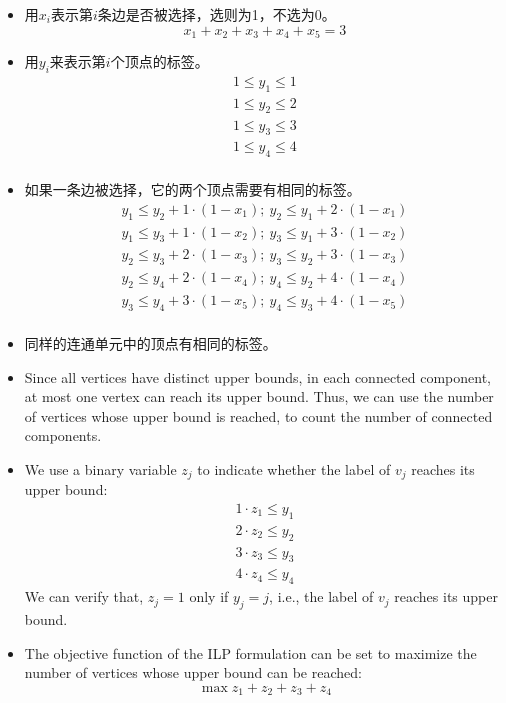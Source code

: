 \begin{itemize}
	\item 用$x_{i}$表示第$i$条边是否被选择，选则为1，不选为0。
		\begin{displaymath}
			x_1 + x_2 + x_3 + x_4 + x_5 = 3
		\end{displaymath}
    \item 用$y_i$来表示第$i$个顶点的标签。
		\begin{eqnarray*}
			1\le  y_1  \le 1\\
			1\le  y_2  \le 2\\
			1\le  y_3  \le 3\\
			1\le  y_4  \le 4\\
		\end{eqnarray*}
    \item 如果一条边被选择，它的两个顶点需要有相同的标签。
		\begin{align*}
			y_1 \le y_2 + 1 \cdot (1 - x_1);\  y_2 \le y_1 + 2 \cdot (1 - x_1) \tag{for $e_1$}\\
			y_1 \le y_3 + 1 \cdot (1 - x_2);\  y_3 \le y_1 + 3 \cdot (1 - x_2) \tag{for $e_2$}\\
			y_2 \le y_3 + 2 \cdot (1 - x_3);\  y_3 \le y_2 + 3 \cdot (1 - x_3) \tag{for $e_3$}\\
			y_2 \le y_4 + 2 \cdot (1 - x_4);\  y_4 \le y_2 + 4 \cdot (1 - x_4) \tag{for $e_4$}\\
			y_3 \le y_4 + 3 \cdot (1 - x_5);\  y_4 \le y_3 + 4 \cdot (1 - x_5) \tag{for $e_5$}\\
		\end{align*}
    \item 同样的连通单元中的顶点有相同的标签。

	\item Since all vertices have distinct upper bounds, in each connected
	component, at most one vertex can reach its upper bound. Thus, we
	can use the number of vertices whose upper bound is reached, to count the number of connected components.
    \item<2-> We use a binary variable $z_j$ to indicate whether the label of $v_j$ reaches its upper bound:
		\begin{eqnarray*}
			1 \cdot z_1 \le y_1 \\
			2 \cdot z_2 \le y_2 \\
			3 \cdot z_3 \le y_3 \\
			4 \cdot z_4 \le y_4
		\end{eqnarray*}
	We can verify that, $z_j = 1$ only if $y_j = j$, i.e., the label of $v_j$ reaches its upper bound.
	\item The objective function of the ILP formulation can be set to maximize the number of vertices
		whose upper bound can be reached:
		\begin{displaymath}
			\max z_1 + z_2 + z_3 + z_4
		\end{displaymath}
\end{itemize}

